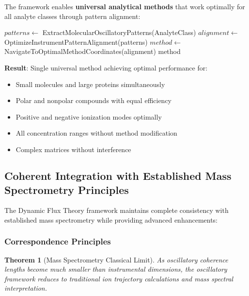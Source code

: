 \documentclass[11pt,a4paper]{article}
\newtheorem{theorem}{Theorem}[section]
\theoremstyle{remark}
\begin{document}
The framework enables \textbf{universal analytical methods} that work optimally for all analyte classes through pattern alignment:

\begin{algorithm}
\caption{Universal Mass Spectrometry Method Development}
\begin{algorithmic}
    \State $patterns \gets$ ExtractMolecularOscillatoryPatterns(AnalyteClass)
    \State $alignment \gets$ OptimizeInstrumentPatternAlignment(patterns)
    \State $method \gets$ NavigateToOptimalMethodCoordinates(alignment)
    \State \Return method
\EndProcedure
\end{algorithmic}
\end{algorithm}

\textbf{Result}: Single universal method achieving optimal performance for:
\begin{itemize}
\item Small molecules and large proteins simultaneously
\item Polar and nonpolar compounds with equal efficiency  
\item Positive and negative ionization modes optimally
\item All concentration ranges without method modification
\item Complex matrices without interference
\end{itemize}

\subsection{Coherent Integration with Established Mass Spectrometry Principles}

The Dynamic Flux Theory framework maintains complete consistency with established mass spectrometry while providing advanced enhancements:

\subsubsection{Correspondence Principles}

\begin{theorem}[Mass Spectrometry Classical Limit]
As oscillatory coherence lengths become much smaller than instrumental dimensions, the oscillatory framework reduces to traditional ion trajectory calculations and mass spectral interpretation.
\end{theorem}
\end{document}
